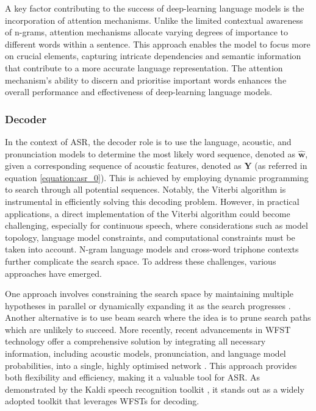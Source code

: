 A key factor contributing to the success of deep-learning language models is the incorporation of attention mechanisms. Unlike the limited contextual awareness of n-grams, attention mechanisms allocate varying degrees of importance to different words within a sentence. This approach enables the model to focus more on crucial elements, capturing intricate dependencies and semantic information that contribute to a more accurate language representation. The attention mechanism's ability to discern and prioritise important words enhances the overall performance and effectiveness of deep-learning language models.


\subsubsection{Decoder}%

In the context of \ac{ASR}, the decoder role is to use the language, acoustic, and pronunciation models to determine the most likely word sequence, denoted as $\boldsymbol{\hat{w}}$, given a corresponding sequence of acoustic features, denoted as $\boldsymbol{Y}$ (as referred in equation \ref{equation:asr_0}). This is achieved by employing dynamic programming to search through all potential sequences. Notably, the Viterbi algorithm \cite{viterbi_decoder} is instrumental in efficiently solving this decoding problem. However, in practical applications, a direct implementation of the Viterbi algorithm could become challenging, especially for continuous speech, where considerations such as model topology, language model constraints, and computational constraints must be taken into account. N-gram language models and cross-word triphone contexts further complicate the search space. To address these challenges, various approaches have emerged. 

One approach involves constraining the search space by maintaining multiple hypotheses in parallel \cite{valtchev1994novel} or dynamically expanding it as the search progresses \cite{aubert1995large}. Another alternative is to use beam search where the idea is to prune search paths which are unlikely to succeed. More recently, recent advancements in \ac{WFST} technology offer a comprehensive solution by integrating all necessary information, including acoustic models, pronunciation, and language model probabilities, into a single, highly optimised network \cite{mohri1997finite,caseiro2002using}. This approach provides both flexibility and efficiency, making it a valuable tool for \ac{ASR}. As demonstrated by the Kaldi speech recognition toolkit \cite{kaldi}, it stands out as a widely adopted toolkit that leverages \acp{WFST} for decoding. 

